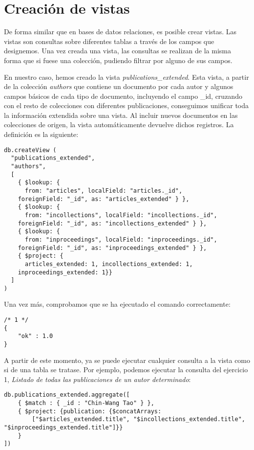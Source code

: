 \section{Creación de vistas}\label{sec:parser}

De forma similar que en bases de datos relaciones, es posible crear vistas. Las vistas son consultas sobre diferentes tablas a través de los campos que designemos. Una vez creada una vista, las consultas se realizan de la misma forma que si fuese una colección, pudiendo filtrar por alguno de sus campos.

En nuestro caso, hemos creado la vista \textit{publications\_extended}. Esta vista, a partir de la colección \textit{authors} que contiene un documento por cada autor y algunos campos básicos de cada tipo de documento, incluyendo el campo \_id, cruzando con el resto de colecciones con diferentes publicaciones, conseguimos unificar toda la información extendida sobre una vista. Al incluir nuevos documentos en las colecciones de origen, la vista automáticamente devuelve dichos registros. La definición es la siguiente:

\begin{verbatim}
db.createView (
  "publications_extended",
  "authors",
  [
    { $lookup: { 
      from: "articles", localField: "articles._id",
    foreignField: "_id", as: "articles_extended" } },
    { $lookup: { 
      from: "incollections", localField: "incollections._id", 
    foreignField: "_id", as: "incollections_extended" } },
    { $lookup: { 
      from: "inproceedings", localField: "inproceedings._id",
    foreignField: "_id", as: "inproceedings_extended" } },
    { $project: { 
      articles_extended: 1, incollections_extended: 1,
    inproceedings_extended: 1}}
  ]
)
\end{verbatim}

Una vez más, comprobamos que se ha ejecutado el comando correctamente:

\begin{verbatim}
/* 1 */
{
    "ok" : 1.0
}
\end{verbatim}

A partir de este momento, ya se puede ejecutar cualquier consulta a la vista como si de una tabla se tratase. Por ejemplo, podemos ejecutar la consulta del ejercicio 1, \textit{Listado de todas las publicaciones de un autor determinado}:


\begin{verbatim}
db.publications_extended.aggregate([
    { $match : { _id : "Chin-Wang Tao" } },
    { $project: {publication: {$concatArrays:
        ["$articles_extended.title", "$incollections_extended.title", "$inproceedings_extended.title"]}}
    }
])
\end{verbatim}

